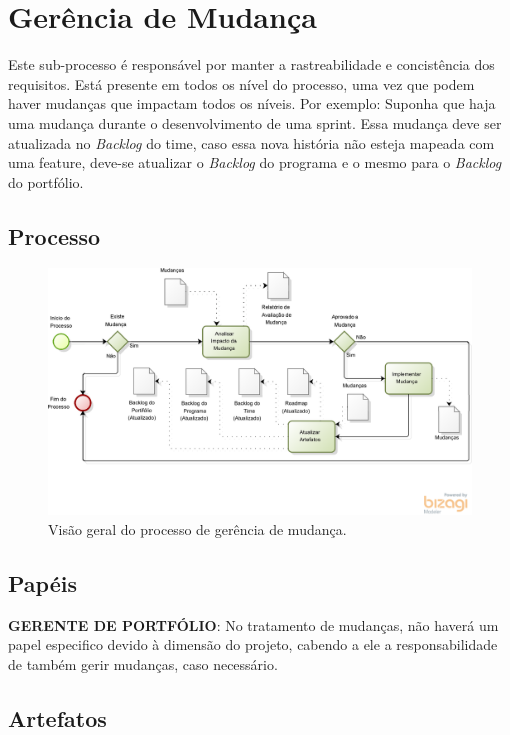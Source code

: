 \section{Gerência de Mudança}\label{sec:gerencia}

  Este sub-processo é responsável por manter a rastreabilidade e concistência dos requisitos.
  Está presente em todos os nível do processo, uma vez que podem haver mudanças que impactam todos
  os níveis. Por exemplo: Suponha que haja uma mudança durante o desenvolvimento de uma sprint.
  Essa mudança deve ser atualizada no \textit{Backlog} do time, caso essa nova história não esteja mapeada com
  uma feature, deve-se atualizar o \textit{Backlog} do programa e o mesmo para o \textit{Backlog} do portfólio.

\subsection{Processo}
  \begin{figure}[H]
      \centering
    \includegraphics[keepaspectratio=true,scale=0.6]{figuras/gerencia.eps}
      \caption{Visão geral do processo de gerência de mudança.}
      \label{fig:gerencia}
  \end{figure}

\subsection{Papéis}

  \textbf{GERENTE DE PORTFÓLIO}: No tratamento de mudanças, não haverá um papel especifico devido
à dimensão do projeto, cabendo a ele a responsabilidade de também gerir mudanças, caso necessário.

\subsection{Artefatos}

